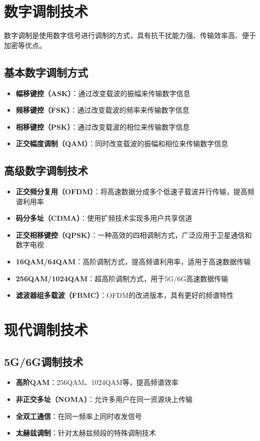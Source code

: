 \documentclass[12pt,UTF8]{ctexbook}
\begin{document}
\section{数字调制技术}

数字调制是使用数字信号进行调制的方式，具有抗干扰能力强、传输效率高、便于加密等优点。

\subsection{基本数字调制方式}
\begin{itemize}[leftmargin=3.5em]
    \item \textbf{幅移键控（ASK）}：通过改变载波的振幅来传输数字信息
    \item \textbf{频移键控（FSK）}：通过改变载波的频率来传输数字信息
    \item \textbf{相移键控（PSK）}：通过改变载波的相位来传输数字信息
    \item \textbf{正交幅度调制（QAM）}：同时改变载波的振幅和相位来传输数字信息
\end{itemize}

\subsection{高级数字调制技术}
\begin{itemize}[leftmargin=3.5em]
    \item \textbf{正交频分复用（OFDM）}：将高速数据分成多个低速子载波并行传输，提高频谱利用率
    \item \textbf{码分多址（CDMA）}：使用扩频技术实现多用户共享信道
    \item \textbf{正交相移键控（QPSK）}：一种高效的四相调制方式，广泛应用于卫星通信和数字电视
    \item \textbf{16QAM/64QAM}：高阶调制方式，提高频谱利用率，适用于高速数据传输
    \item \textbf{256QAM/1024QAM}：超高阶调制方式，用于5G/6G高速数据传输
    \item \textbf{滤波器组多载波（FBMC）}：OFDM的改进版本，具有更好的频谱特性
\end{itemize}

\section{现代调制技术}

\subsection{5G/6G调制技术}
\begin{itemize}[leftmargin=3.5em]
    \item \textbf{高阶QAM}：256QAM、1024QAM等，提高频谱效率
    \item \textbf{非正交多址（NOMA）}：允许多用户在同一资源块上传输
    \item \textbf{全双工通信}：在同一频率上同时收发信号
    \item \textbf{太赫兹调制}：针对太赫兹频段的特殊调制技术
\end{itemize}
\end{document}

